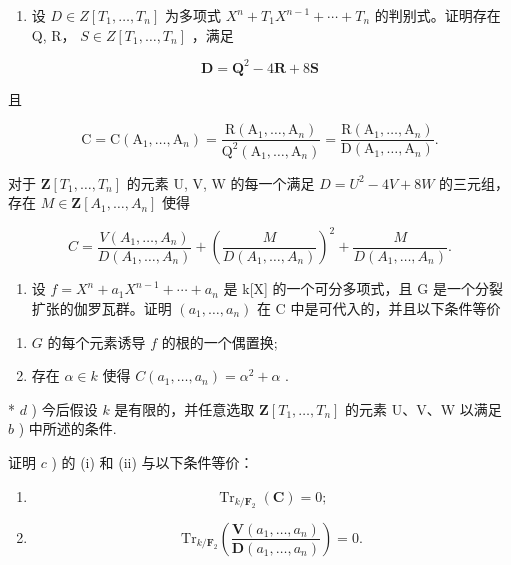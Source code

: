 \begin{enumerate}
\def\labelenumi{\alph{enumi})}
\setcounter{enumi}{1}
\tightlist
\item
  设 \(D \in Z[T_{1}, \ldots, T_{n}]\) 为多项式 \(X^{n} + T_{1}X^{n-1} + \cdots + T_{n}\) 的判别式。证明存在 Q, R， \(S \in Z[T_{1}, \ldots, T_{n}]\) ，满足
\end{enumerate}

\[
\mathbf {D} = \mathbf {Q} ^ {2} - 4 \mathbf {R} + 8 \mathbf {S}
\]

且

\[
\mathrm{C} = \mathrm{C} (\mathrm{A} _ {1}, \dots , \mathrm{A} _ {n}) = \frac {\mathrm{R} (\mathrm{A} _ {1} , \dots , \mathrm{A} _ {n})}{\mathrm{Q} ^ {2} (\mathrm{A} _ {1} , \dots , \mathrm{A} _ {n})} = \frac {\mathrm{R} (\mathrm{A} _ {1} , \dots , \mathrm{A} _ {n})}{\mathrm{D} (\mathrm{A} _ {1} , \dots , \mathrm{A} _ {n})}.
\]

对于 \(\mathbf{Z}[T_1, \ldots, T_n]\) 的元素 U, V, W 的每一个满足 \(D = U^2 - 4V + 8W\) 的三元组，存在 \(M \in \mathbf{Z}[A_1, \ldots, A_n]\) 使得

\[
C = \frac {V (A _ {1} , \dots , A _ {n})}{D (A _ {1} , \dots , A _ {n})} + \left(\frac {M}{D (A _ {1} , \dots , A _ {n})}\right) ^ {2} + \frac {M}{D (A _ {1} , \dots , A _ {n})}.
\]

\begin{enumerate}
\def\labelenumi{\alph{enumi})}
\setcounter{enumi}{2}
\tightlist
\item
  设 \(f = X^{n} + a_{1}X^{n-1} + \cdots + a_{n}\) 是 k{[}X{]} 的一个可分多项式，且 G 是一个分裂扩张的伽罗瓦群。证明 \((a_{1}, \ldots, a_{n})\) 在 C 中是可代入的，并且以下条件等价
\end{enumerate}

\begin{enumerate}
\def\labelenumi{(\roman{enumi})}
\item
  \(G\) 的每个元素诱导 \(f\) 的根的一个偶置换;
\item
  存在 \(\alpha \in k\) 使得 \(C(a_{1},\ldots ,a_{n}) = \alpha^{2} + \alpha\) .
\end{enumerate}

* \(d\) ) 今后假设 \(k\) 是有限的，并任意选取 \(\mathbf{Z}[T_1, \ldots, T_n]\) 的元素 U、V、W 以满足 \(b\) ) 中所述的条件.

证明 \(c\) ) 的 (i) 和 (ii) 与以下条件等价：

\begin{enumerate}
\def\labelenumi{(\roman{enumi})}
\setcounter{enumi}{2}
\tightlist
\item
  \[
\operatorname{Tr} _ {k / \mathbf {F} _ {2}} (\mathbf {C}) = 0;
\]
\item
  \[
\mathrm{Tr} _ {k / \mathbf {F} _ {2}} \left(\frac {\mathbf {V} (a _ {1} , \dots , a _ {n})}{\mathbf {D} (a _ {1} , \dots , a _ {n})}\right) = 0.
\]
\end{enumerate}

